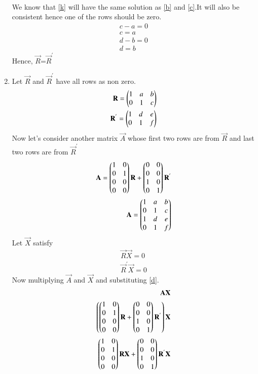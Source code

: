\documentclass[journal,12pt,twocolumn]{IEEEtran}
\begin{document}
\begin{enumerate}
\begin{align}
  \end{align}
  We know that \eqref{k} will have the same solution as \eqref{b} and \eqref{c}.It will also be consistent hence one of the rows should be zero.
  \begin{align}
  c-a=0\\
  c=a\\
  d-b=0\\
  d=b
  \end{align}
 Hence, $\vec{R}$=$\vec{R}^{\prime}$
 \item Let $\vec{R}$ and $\vec{R}^{'}$ have all rows as non zero.
\begin{align}\mathbf{R}=\begin{pmatrix}1&a&b\\0&1&c\end{pmatrix} \\\mathbf{R}^{'}=\begin{pmatrix}1&d&e\\0&1&f\end{pmatrix}\end{align}Now let's consider another matrix $\vec{A}$ whose first two rows are from $\vec{R}$ and last two rows are from $\vec{R}^'$
 \begin{align}
 \mathbf{A}=\begin{pmatrix}1&0\\0&1\\0&0\\0&0\end{pmatrix}\mathbf{R}+\begin{pmatrix}0&0\\0&0\\1&0\\0&1\end{pmatrix}\mathbf{R}^{'}\label{d}\\
 \mathbf{A}=\begin{pmatrix}1&a&b\\0&1&c\\1&d&e\\0&1&f\end{pmatrix}
 \end{align}
 Let $\vec{X}$ satisfy
  \begin{align}
  \vec{R}\vec{X}=0\label{e}\\
  \vec{R}^{'}\vec{X}=0\label{f}
  \end{align}
Now multiplying $\vec{A}$ and $\vec{X}$ and substituting \eqref{d}.
  \begin{align}
  \mathbf{A}\mathbf{X}\\
  \left(\begin{pmatrix}1&0\\0&1\\0&0\\0&0\end{pmatrix}\mathbf{R}+\begin{pmatrix}0&0\\0&0\\1&0\\0&1\end{pmatrix}\mathbf{R}^{'}\right)\mathbf{X}\\
  \begin{pmatrix}1&0\\0&1\\0&0\\0&0\end{pmatrix}\mathbf{R}\mathbf{X}+\begin{pmatrix}0&0\\0&0\\1&0\\0&1\end{pmatrix}\mathbf{R}^{'}\mathbf{X} \end{align}

\end{enumerate}
\end{document}
